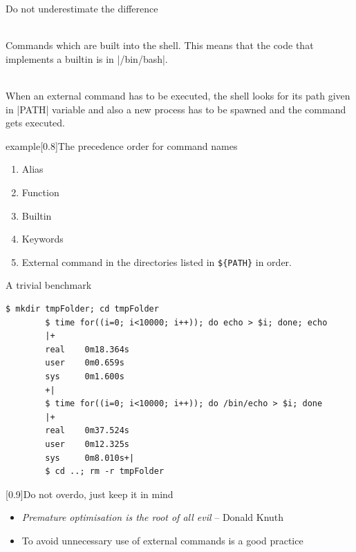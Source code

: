 
\begin{frame}{Do not underestimate the difference}
    \vspace{-1mm}
    \begin{description}[XXX]
        \item[\textbf{Internal Commands:}] ~ \\
            Commands which are built into the shell.
            This means that the code that implements a builtin is in \bash|/bin/bash|.
        \item[\textbf{External Commands:}] ~ \\
            When an external command has to be executed, the shell looks for its path given in \bash|PATH| variable and also a new process has to be spawned and the command gets executed.
    \end{description}
    \begin{varblock}{example}[0.8\textwidth]{The precedence order for command names}
        \begin{enumerate}
            \item Alias
            \item Function 
            \item Builtin  
            \item Keywords
            \item External command in the directories listed in \texttt{\$\{PATH\}} in order.
        \end{enumerate}
    \end{varblock}
\end{frame}
\begin{frame}[fragile]{A trivial benchmark}
    \begin{lstlisting}[style=MyBash]
        $ mkdir tmpFolder; cd tmpFolder
        $ time for((i=0; i<10000; i++)); do echo > $i; done; echo
        |+
        real    0m18.364s
        user    0m0.659s
        sys     0m1.600s
        +|
        $ time for((i=0; i<10000; i++)); do /bin/echo > $i; done
        |+
        real    0m37.524s
        user    0m12.325s
        sys     0m8.010s+|
        $ cd ..; rm -r tmpFolder
    \end{lstlisting}
    \medskip
    \begin{varblock}{}[0.9\textwidth]{Do not overdo, just keep it in mind}
        \begin{itemize}
            \item \emph{\guillemotleft Premature optimisation is the root of all evil\guillemotright} -- Donald Knuth
            \item To avoid unnecessary use of external commands is a good practice
        \end{itemize}
    \end{varblock}
\end{frame}
